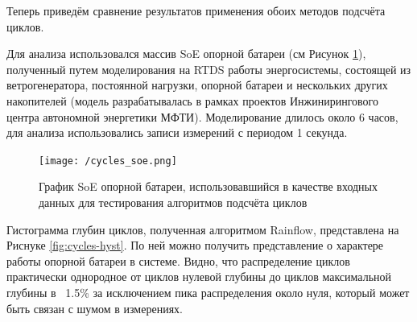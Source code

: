 \begin{enumerate}
\begin{algorithm}
\begin{algorithmic}[1]
 
\EndFunction
\Statex

     
    \EndWhile
\EndIf
{}
    \EndWhile
    
\EndIf
{}
\EndWhile
 
\end{algorithmic}
\end{algorithm}

\end{enumerate}

Теперь приведём сравнение результатов применения обоих методов подсчёта циклов.

Для анализа использовался массив SoE опорной батареи (см Рисунок \ref{fig:core-cycles-line}), полученный путем моделирования на RTDS работы энергосистемы, состоящей из ветрогенератора, постоянной нагрузки, опорной батареи и нескольких других накопителей (модель разрабатывалась в рамках проектов Инжинирингового центра автономной энергетики МФТИ).
Моделирование длилось около 6 часов, для анализа использовались записи измерений с периодом 1 секунда.

\begin{figure}[h]
\texttt{[image: /cycles\_soe.png]}
\caption{График SoE опорной батареи, использовавшийся в качестве входных данных для тестирования алгоритмов подсчёта циклов}
\centering
\label{fig:core-cycles-line}
\end{figure}

\medskip

Гистограмма глубин циклов, полученная алгоритмом Rainflow, представлена на Риснуке \ref{fig:cycles-hyst}.
По ней можно получить представление о характере работы опорной батареи в системе.
Видно, что распределение циклов практически однородное от циклов нулевой глубины до циклов максимальной глубины в ~1.5\% за исключением пика распределения около нуля, который может быть связан с шумом в измерениях.


